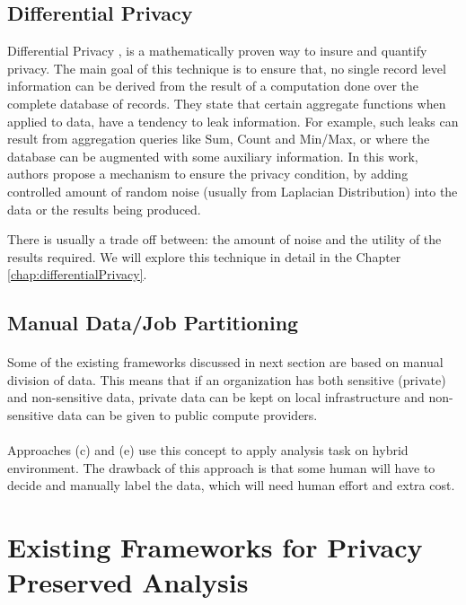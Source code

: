 \documentclass[12pt]{report}
\theoremstyle{named}
\begin{document}
\subsection{Differential Privacy}
Differential Privacy \cite{Dwork:2006:DP:2097282.2097284}, is a mathematically proven way to insure and quantify privacy. The main goal of this technique is to ensure that, no single record level information can be derived from the result of a computation done over the complete database of records. They state that certain aggregate functions when applied to data, have a tendency to leak information.  For example, such leaks can result from aggregation queries like Sum, Count and Min/Max, or where the database can be augmented with some auxiliary information. In this work, authors propose a mechanism to ensure the privacy condition, by adding controlled amount of random noise (usually from Laplacian Distribution) into the data or the results being produced.

There is usually a trade off between: the amount of noise and the utility of the results required. We will explore this technique in detail in the Chapter \ref{chap:differentialPrivacy}.


\subsection{Manual Data/Job Partitioning}
\paragraph{}
Some of the existing frameworks discussed in next section are based on manual division of data. This means that if an organization has both sensitive (private) and non-sensitive data, private data can be kept on local infrastructure and non-sensitive data can be given to public compute providers.
\paragraph{}
Approaches \cite{zhang2011sedic}\cite{xu2015framework} (c) and \cite{ko2011hybrex} (e) use this concept to apply analysis task on hybrid environment.
The drawback of this approach is that some human will have to decide and manually label the data, which will need human effort and extra cost.



\section{Existing Frameworks for Privacy Preserved Analysis}
\end{document}
